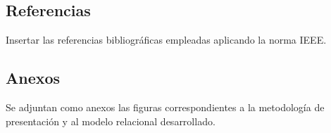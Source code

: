 \documentclass{article}
\begin{document}
\subsection{Referencias}
Insertar las referencias bibliográficas empleadas aplicando la norma IEEE.

\vspace{-3em}
\renewcommand{\refname}{}



\subsection{Anexos}
Se adjuntan como anexos las figuras correspondientes a la metodología de presentación y al modelo relacional desarrollado.

\vfill
\end{document}
